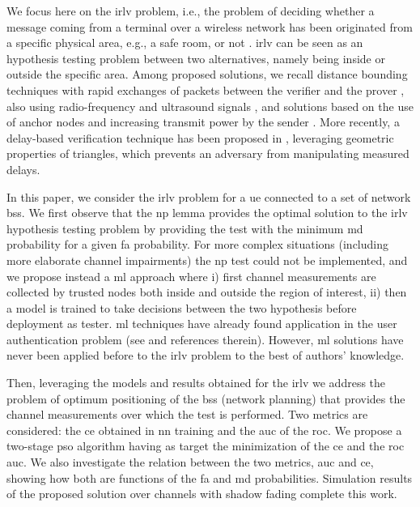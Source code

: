 \documentclass[conference,draftcls,onecolumn]{IEEEtran}
\begin{document}
We focus here on the \ac{irlv} problem, i.e., the problem of deciding whether a message coming from a terminal over a wireless network has been originated from a specific physical area, e.g., a safe room, or not \cite{Zeng-survey}. \ac{irlv} can be seen as an hypothesis testing problem between two alternatives, namely being inside or outside the specific area. Among proposed solutions, we recall distance bounding techniques with rapid exchanges of packets between the verifier and the prover \cite{Brands}, also using radio-frequency and ultrasound signals \cite{Sastry}, and solutions based on the use of anchor nodes and increasing transmit power by the sender \cite{Vora}. More recently, a delay-based verification technique has been proposed  in \cite{7145434}, leveraging geometric properties of triangles, which prevents an adversary from manipulating measured delays.  

In this paper, we consider the \ac{irlv} problem for a \ac{ue} connected to a set of network \acp{bs}. We first observe that the  \ac{np} lemma \cite{Neyman289} provides the optimal solution to the \ac{irlv} hypothesis testing problem by providing  the test with the minimum \ac{md} probability for a given \ac{fa} probability. For more complex situations (including more elaborate channel impairments) the \ac{np} test could not be implemented, and we propose instead a \ac{ml} approach  where i) first channel measurements are collected by trusted nodes both inside and outside the region of interest, ii) then a model is trained to take decisions between the two hypothesis before deployment as tester. \ac{ml} techniques have already found application in the user authentication problem (see  \cite{xiao-2018} and references therein). However, \ac{ml} solutions have never been applied before to the \ac{irlv} problem to the best of authors' knowledge. 

Then, leveraging the  models and results obtained for the \ac{irlv} we address the problem of optimum positioning of the \acp{bs} (network planning) that provides the channel measurements over which the test is performed. Two metrics are considered: the \ac{ce} obtained in \ac{nn} training and the \ac{auc} of the \ac{roc}. We propose a two-stage \ac{pso} algorithm having as target the  minimization of  the \ac{ce} and  the \ac{roc} \ac{auc}. We also investigate the relation between the two metrics, \ac{auc} and \ac{ce}, showing how both are functions of the \ac{fa} and \ac{md} probabilities. Simulation results of the proposed solution over channels with shadow fading complete this work.
\end{document}
